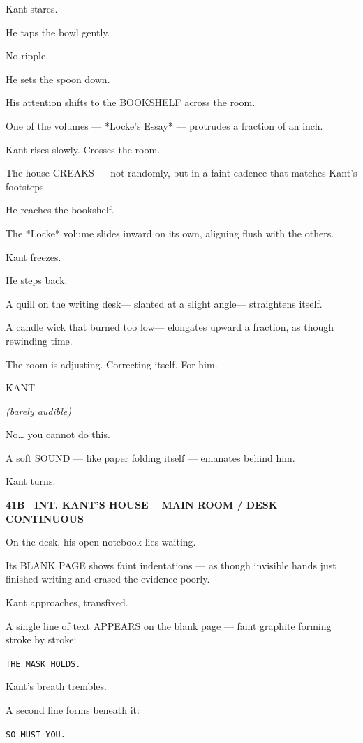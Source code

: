 \documentclass[12pt]{article}
\newcommand{\scene}[2]{%
  \vspace{1.8\baselineskip}%
  \noindent\textbf{#1 \ #2}\par\vspace{0.4\baselineskip}%
}
\newenvironment{dialogue}[1]{%
  \vspace{0.8\baselineskip}%
  \noindent\hspace*{2.3in}\textsc{#1}\par%
  \noindent\hspace*{1.5in}\begin{minipage}[t]{4.5in}%
}{%
  \end{minipage}\par%
}
\newcommand{\paren}[1]{%
  \noindent\hspace*{1.8in}\textit{(#1)}\par%
}
\begin{document}
Kant stares.

He taps the bowl gently.

No ripple.

He sets the spoon down.

His attention shifts to the BOOKSHELF across the room.

One of the volumes — *Locke’s Essay* — protrudes a fraction of an inch.

Kant rises slowly. Crosses the room.

The house CREAKS —
not randomly, but in a faint cadence that matches Kant’s footsteps.

He reaches the bookshelf.

The *Locke* volume slides inward on its own, aligning flush with the
others.

Kant freezes.

He steps back.

A quill on the writing desk—
slanted at a slight angle—
straightens itself.

A candle wick that burned too low—
elongates upward a fraction, as though rewinding time.

The room is adjusting.
Correcting itself.
For him.

\begin{dialogue}{KANT}
\paren{barely audible}
No… you cannot do this.
\end{dialogue}

A soft SOUND — like paper folding itself — emanates behind him.

Kant turns.


\scene{41B}{INT. KANT'S HOUSE -- MAIN ROOM / DESK -- CONTINUOUS}

On the desk, his open notebook lies waiting.

Its BLANK PAGE shows faint indentations —
as though invisible hands just finished writing
and erased the evidence poorly.

Kant approaches, transfixed.

A single line of text APPEARS on the blank page —
faint graphite forming stroke by stroke:

\centerline{\texttt{THE MASK HOLDS.}}

Kant’s breath trembles.

A second line forms beneath it:

\centerline{\texttt{SO MUST YOU.}}
\end{document}
